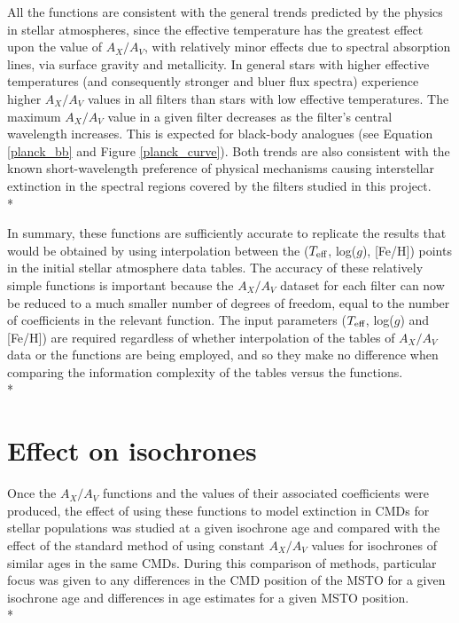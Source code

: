 \documentclass[12pt, a4paper]{report}
\begin{document}
All the functions are consistent with the general trends predicted by the physics in stellar atmospheres, since the effective temperature has the greatest effect upon the value of $A_{X}/A_{V}$, with relatively minor effects due to spectral absorption lines, via surface gravity and metallicity. In general stars with higher effective temperatures (and consequently stronger and bluer flux spectra) experience higher $A_{X}/A_{V}$ values in all filters than stars with low effective temperatures. The maximum $A_{X}/A_{V}$ value in a given filter decreases as the filter's central wavelength increases. This is expected for black-body analogues (see Equation \ref{planck_bb} and Figure \ref{planck_curve}). Both trends are also consistent with the known short-wavelength preference of physical mechanisms causing interstellar extinction in the spectral regions covered by the filters studied in this project.\\*

In summary, these functions are sufficiently accurate to replicate the results that would be obtained by using interpolation between the ($T_{\textnormal{eff}}$, log($g$), [Fe/H]) points in the initial stellar atmosphere data tables. The accuracy of these relatively simple functions is important because the $A_{X}/A_{V}$ dataset for each filter can now be reduced to a much smaller number of degrees of freedom, equal to the number of coefficients in the relevant function. The input parameters ($T_{\textnormal{eff}}$, log($g$) and [Fe/H]) are required regardless of whether interpolation of the tables of $A_{X}/A_{V}$ data or the functions are being employed, and so they make no difference when comparing the information complexity of the tables versus the functions.\\*


\section{Effect on isochrones} \label{result_CMDs}
Once the $A_{X}/A_{V}$ functions and the values of their associated coefficients were produced, the effect of using these functions to model extinction in CMDs for stellar populations was studied at a given isochrone age and compared with the effect of the standard method of using constant $A_{X}/A_{V}$ values for isochrones of similar ages in the same CMDs. During this comparison of methods, particular focus was given to any differences in the CMD position of the MSTO for a given isochrone age and differences in age estimates for a given MSTO position.  \\*
\end{document}
